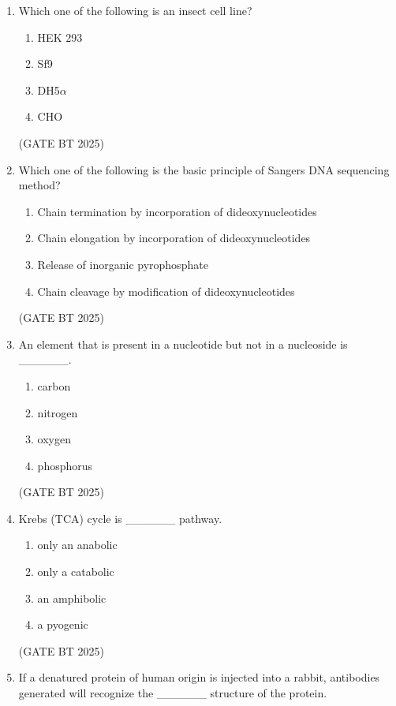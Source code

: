\documentclass[journal,12pt,onecolumn]{IEEEtran}
\theoremstyle{remark}
\begin{document}
\begin{enumerate}
\item 
Which one of the following is an insect cell line?

\begin{enumerate}
    \item HEK 293
    \item Sf9
    \item DH5$\alpha$
    \item CHO
\end{enumerate}
\hfill(GATE BT 2025)

\item 
Which one of the following is the basic principle of Sangers DNA sequencing method?

\begin{enumerate}
    \item Chain termination by incorporation of dideoxynucleotides
    \item Chain elongation by incorporation of dideoxynucleotides
    \item Release of inorganic pyrophosphate
    \item Chain cleavage by modification of dideoxynucleotides
\end{enumerate}
\hfill(GATE BT 2025)

\item 
An element that is present in a nucleotide but not in a nucleoside is \_\_\_\_\_\_.

\begin{enumerate}
    \item carbon
    \item nitrogen
    \item oxygen
    \item phosphorus
\end{enumerate}
\hfill(GATE BT 2025)

\item 
Krebs (TCA) cycle is \_\_\_\_\_\_ pathway.

\begin{enumerate}
    \item only an anabolic
    \item only a catabolic
    \item an amphibolic
    \item a pyogenic
\end{enumerate}
\hfill(GATE BT 2025)

\item 
If a denatured protein of human origin is injected into a rabbit, antibodies generated will recognize the \_\_\_\_\_\_ structure of the protein.


\end{enumerate}
\end{document}
